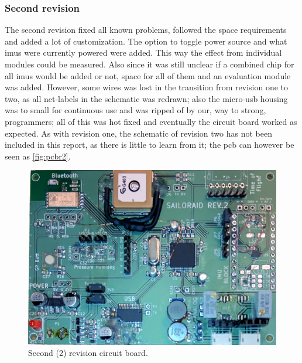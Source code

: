 \subsubsection{Second revision}
The second revision fixed all known problems, followed the space requirements and added a lot of customization. The option to toggle power source and what \gls{imu}s were currently powered were added. This way the effect from individual modules could be measured. Also since it was still unclear if a combined chip for all \gls{imu}s would be added or not, space for all of them and an evaluation module was added. However, some wires was lost in the transition from revision one to two, as all net-labels in the schematic was redrawn; also the micro-\gls{usb} housing was to small for continuous use and was ripped of by our, way to strong, programmers; all of this was hot fixed and eventually the circuit board worked as expected. As with revision one, the schematic of revision two has not been included in this report, as there is little to learn from it; the \gls{pcb} can however be seen as \autoref{fig:pcbr2}.
\begin{figure}[H]
	\centering
	\includegraphics[width=\linewidth]{Figures/pcb_rev2.jpg}
	\caption{Second (2) revision circuit board.}
	\label{fig:pcbr2}
\end{figure}

